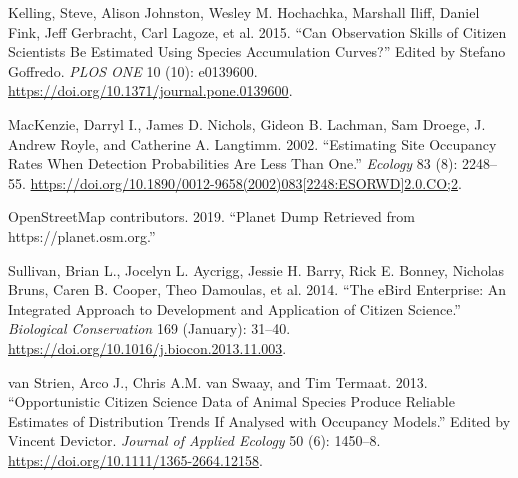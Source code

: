 \documentclass[]{article}
\begin{document}
\leavevmode\hypertarget{ref-kelling2015a}{}%
Kelling, Steve, Alison Johnston, Wesley M. Hochachka, Marshall Iliff, Daniel Fink, Jeff Gerbracht, Carl Lagoze, et al. 2015. ``Can Observation Skills of Citizen Scientists Be Estimated Using Species Accumulation Curves?'' Edited by Stefano Goffredo. \emph{PLOS ONE} 10 (10): e0139600. \url{https://doi.org/10.1371/journal.pone.0139600}.

\leavevmode\hypertarget{ref-mackenzie2002}{}%
MacKenzie, Darryl I., James D. Nichols, Gideon B. Lachman, Sam Droege, J. Andrew Royle, and Catherine A. Langtimm. 2002. ``Estimating Site Occupancy Rates When Detection Probabilities Are Less Than One.'' \emph{Ecology} 83 (8): 2248--55. \href{https://doi.org/10.1890/0012-9658(2002)083\%5B2248:ESORWD\%5D2.0.CO;2}{https://doi.org/10.1890/0012-9658(2002)083{[}2248:ESORWD{]}2.0.CO;2}.

\leavevmode\hypertarget{ref-OpenStreetMap}{}%
OpenStreetMap contributors. 2019. ``Planet Dump Retrieved from https://planet.osm.org.''

\leavevmode\hypertarget{ref-sullivan2014}{}%
Sullivan, Brian L., Jocelyn L. Aycrigg, Jessie H. Barry, Rick E. Bonney, Nicholas Bruns, Caren B. Cooper, Theo Damoulas, et al. 2014. ``The eBird Enterprise: An Integrated Approach to Development and Application of Citizen Science.'' \emph{Biological Conservation} 169 (January): 31--40. \url{https://doi.org/10.1016/j.biocon.2013.11.003}.

\leavevmode\hypertarget{ref-vanstrien2013}{}%
van Strien, Arco J., Chris A.M. van Swaay, and Tim Termaat. 2013. ``Opportunistic Citizen Science Data of Animal Species Produce Reliable Estimates of Distribution Trends If Analysed with Occupancy Models.'' Edited by Vincent Devictor. \emph{Journal of Applied Ecology} 50 (6): 1450--8. \url{https://doi.org/10.1111/1365-2664.12158}.
\end{document}

